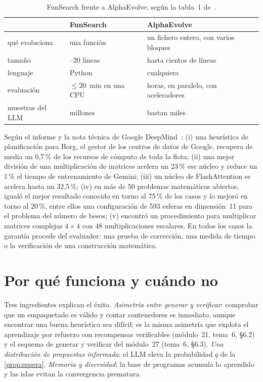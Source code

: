 \begin{table}[h]
\centering\small
\caption{FunSearch frente a AlphaEvolve, según la tabla~1 de~\cite{alphaevolve}.}\label{tab:fs-ae}
\begin{tabularx}{\textwidth}{@{}>{\raggedright\arraybackslash}p{3.0cm}>{\raggedright\arraybackslash}X>{\raggedright\arraybackslash}X@{}}
\toprule
 & FunSearch & AlphaEvolve \\
\midrule
qué evoluciona & una función & un fichero entero, con varios bloques \\
tamaño & 10--20 líneas & hasta cientos de líneas \\
lenguaje & Python & cualquiera \\
evaluación & $\le 20$~min en una CPU & horas, en paralelo, con aceleradores \\
muestras del LLM & millones & bastan miles \\
\bottomrule
\end{tabularx}
\end{table}

\begin{ejemplo}\label{ej:ae-resultados}
Según el informe y la nota técnica de Google DeepMind~\cite{alphaevolve,ae-blog}: (i) una heurística de planificación para Borg, el gestor de los centros de datos de Google, recupera de media un 0{,}7\,\% de los recursos de cómputo de toda la flota; (ii) una mejor división de una multiplicación de matrices acelera un 23\,\% ese núcleo y reduce un 1\,\% el tiempo de entrenamiento de Gemini; (iii) un núcleo de FlashAttention se acelera hasta un 32{,}5\,\%; (iv) en más de 50 problemas matemáticos abiertos, igualó el mejor resultado conocido en torno al 75\,\% de los casos y lo mejoró en torno al 20\,\%, entre ellos una configuración de 593 esferas en dimensión~11 para el problema del número de besos; (v) encontró un procedimiento para multiplicar matrices complejas $4\times4$ con 48 multiplicaciones escalares. En todos los casos la garantía procede del evaluador: una prueba de corrección, una medida de tiempo o la verificación de una construcción matemática.
\end{ejemplo}

\section{Por qué funciona y cuándo no}

Tres ingredientes explican el éxito. \emph{Asimetría entre generar y verificar}: comprobar que un empaquetado es válido y contar contenedores es inmediato, aunque encontrar una buena heurística sea difícil; es la misma asimetría que explota el aprendizaje por refuerzo con recompensas verificables (módulo~21, tema~6, §6.2) y el esquema de generar y verificar del módulo~27 (tema~6, §6.3). \emph{Una distribución de propuestas informada}: el LLM eleva la probabilidad $q$ de la \cref{prop:espera}. \emph{Memoria y diversidad}: la base de programas acumula lo aprendido y las islas evitan la convergencia prematura.

